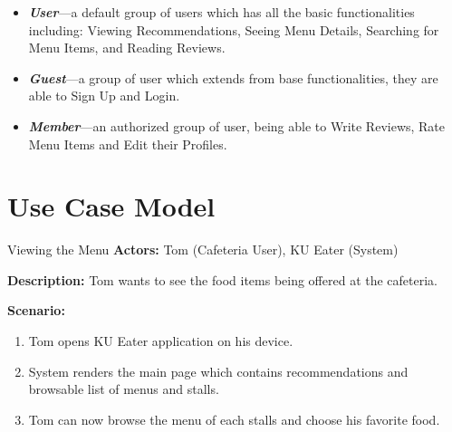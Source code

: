 \begin{itemize}
    \item \textbf{\textit{User}}---a default group of users which has all the basic functionalities including: Viewing Recommendations, Seeing Menu Details,
    Searching for Menu Items, and Reading Reviews.
    \item \textbf{\textit{Guest}}---a group of user which extends from base functionalities, they are able to Sign Up and Login.
    \item \textbf{\textit{Member}}---an authorized group of user, being able to Write Reviews, Rate Menu Items and Edit their Profiles.
\end{itemize}

\section{Use Case Model}
\label{section:use-case-model}


\begin{usecase}{Viewing the Menu}
    \textbf{Actors:} Tom (Cafeteria User), KU Eater (System)
    
    \textbf{Description:} Tom wants to see the food items being offered at the cafeteria.

    \textbf{Scenario:}

    \begin{enumerate}[leftmargin=80pt]
        \item Tom opens KU Eater application on his device.
        \item System renders the main page which contains recommendations and browsable list of menus and stalls.
        \item Tom can now browse the menu of each stalls and choose his favorite food.
    \end{enumerate}
\end{usecase}

